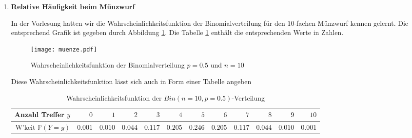 \documentclass[11pt]{article}
\newcommand{\startwert}{0}
\newcommand{\aufgabe}[1]{\item{\bf #1}}
\begin{document}
\begin{enumerate}\addtocounter{enumi}{\startwert}






\aufgabe{Relative Häufigkeit beim Münzwurf}

In der Vorlesung hatten wir die Wahrscheinlichkeitsfunktion der Binomialverteilung für den
$10$-fachen Münzwurf kennen gelernt. Die entsprechend Grafik ist gegeben durch
Abbildung \ref{abb1}. Die Tabelle \ref{tab1} enthält die entsprechenden Werte in Zahlen.

 \begin{figure}[ht]
 	\centering
 	      \texttt{[image: muenze.pdf]}
 	      \caption{Wahrscheinlichkeitsfunktion der Binomialverteilung $p=0.5$ und $n=10$
 	       \label{abb1}}
 	\end{figure}
 	
 	Diese Wahrscheinlichkeitsfunktion  lässt sich auch in Form einer Tabelle angeben
 	 \begin{table}[h]
 \centering 
 \small
\begin{tabular}{|r|r|r|r|r|r|r|r|r|r|r|r|}
  \hline
   Anzahl Treffer  $y$                               & $0$    &   $1$    & $2$   & $3$   & $4$   & $5$ &   $6$    & $7$   & $8$   & $9$   & $10$\\ \hline
   W'keit $\mathbb{P}(Y=y)$ & $0.001$ & $0.010$ & $0.044$ & $0.117$ & $0.205$ & $0.246$ & $0.205$ & $0.117$ & $0.044$ & $0.010$ & $0.001$  \\ \hline
\end{tabular}
 \caption{Wahrscheinlichkeitsfunktion der $Bin(n=10,p=0.5)$-Verteilung \label{tab1}}
 \end{table}  



\end{enumerate}
\end{document}
